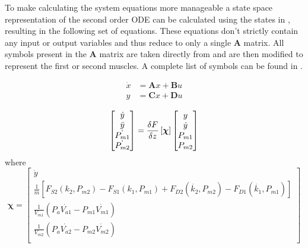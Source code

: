 \documentclass[11pt,a4paper]{article}
\begin{document}
To make calculating the system equations more manageable a state space representation  of the second order ODE can be calculated using the states in , resulting in the following set of equations. These equations don't strictly contain any input or output variables and thus reduce to only a single $\boldsymbol{A}$ matrix. All symbols present in the $\boldsymbol{A}$ matrix are taken directly from  and are then modified to represent the first or second muscles. A complete list of symbols can be found in .\newline

\begin{align}
    \label{math:state_space_representation}
    \dot{x} &= \boldsymbol{A}x + \boldsymbol{B}u\\
    y &= \boldsymbol{C}x + \boldsymbol{D}u\nonumber 
\end{align}

\begin{equation}
\begin{bmatrix}
        \dot{y}\\
        \ddot{y}\\
        \dot{P_{m1}}\\
        \dot{P_{m2}}\\
    \end{bmatrix}
    = \fdv{F}{z}\left[\boldsymbol{\chi}\right]
    \begin{bmatrix}
        y\\
        \dot{y}\\
        P_{m1}\\
        P_{m2}\\
    \end{bmatrix}
    \label{math:state_space_matrix}
\end{equation}
where
\begin{equation*}
        \boldsymbol{\chi} = 
    \begin{bmatrix}
        \dot{y}\\
        \frac{1}{m}[F_{S2}(k_2,P_{m2})-F_{S1}(k_1,P_{m1})+F_{D2}(\dot{k_2},P_{m2})-F_{D1}(\dot{k_1},P_{m1})]\\
        \frac{1}{V_{m1}}(P_a\dot{V_{a1}}-P_{m1}\dot{V_{m1}})\\
        \frac{1}{V_{m2}}(P_a\dot{V_{a2}}-P_{m2}\dot{V_{m2}})\\
    \end{bmatrix}
\end{equation*}
\end{document}
